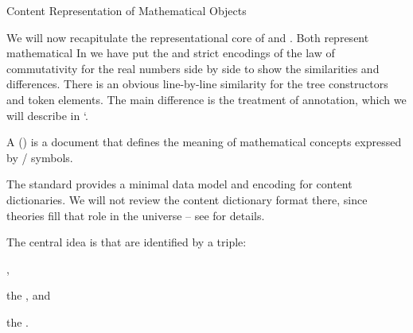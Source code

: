 \begin{omgroup}[id=mobj.core]{Content Representation of Mathematical Objects}

\begin{module}[id=mobj-core]
\begin{omtext}
We will now recapitulate the representational core of \openmath and \cmathml. Both
represent mathematical 
 In {} we have put the \openmath and strict \cmathml encodings
of the law of commutativity for the real numbers side by side to show the similarities and
differences. There is an obvious line-by-line similarity for the tree constructors and
token elements.  The main difference is the treatment of annotation, which we will
describe in `. 
\end{omtext}

\begin{definition}[id=cd.def]
  A  () is a  document
  that defines the meaning of mathematical concepts expressed by \openmath/\mathml
  symbols.
\end{definition}

The  standard provides a minimal data model and \xml encoding for content
dictionaries. We will not review the \openmath content dictionary format there, since
\omdoc theories fill that role in the \omdoc universe -- see  for
details. 

\begin{omtext}
The central idea is that  are identified by a triple: 
\begin{compactenum}
\item {},
\item the ,
  and 
\item the .
\end{compactenum}
\end{omtext}
\end{module}


\end{omgroup}
